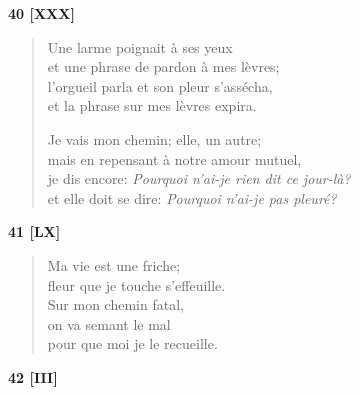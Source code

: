 \bigskip

\begin{center}
  \textbf{40 [XXX]}
\end{center}

\begin{verse}
  Une larme poignait à ses yeux \\
  et une phrase de pardon à mes lèvres; \\
  l'orgueil parla et son pleur s'assécha, \\
  et la phrase sur mes lèvres expira.

  Je vais mon chemin; elle, un autre; \\
  mais en repensant à notre amour mutuel, \\
  je dis encore: \emph{Pourquoi n'ai-je rien dit ce jour-là?} \\
  et elle doit se dire: \emph{Pourquoi n'ai-je pas pleuré?}
\end{verse}


\begin{center}
  \textbf{41 [LX]}
\end{center}

\begin{verse}
  Ma vie est une friche; \\
  fleur que je touche s'effeuille. \\
  Sur mon chemin fatal, \\
  on va semant le mal \\
  pour que moi je le recueille.
\end{verse}


\begin{center}
  \textbf{42 [III]}
\end{center}

